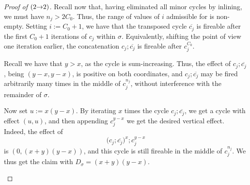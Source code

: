 \begin{proof}[Proof of  $({2}{\rightarrow}{2})$]
Recall now that, having eliminated all minor cycles by inlining,
we must have $n_j > 2C_0$. Thus,
the range of values of $i$ admissible for 
is non-empty. Setting $i := C_0 + 1$, we have that the transposed cycle
$\overline{c_j}$ is fireable after the first $C_0 + 1$ iterations
of $c_j$ within $\sigma$. Equivalently, shifting the point of view
one iteration earlier, the concatenation $c_j; \overline{c_j}$
is fireable after $c_j^{C_0}$.

Recall we have that $y > x$, as the cycle is
sum-increasing. Thus, the effect of $c_j; \overline{c_j}$, being $(y-x, y-x)$,
is positive on both coordinates, and $c_j; \overline{c_j}$ may be fired arbitrarily
many times in the middle of $c_j^{n_j}$, without interference with the remainder of $\sigma$.

Now set $u:=x(y-x)$.
By iterating $x$ times the cycle $c_j; \overline{c_j}$,
we get a cycle with effect $(u,u)$, and then appending
$c_j^{y-x}$ we get the desired vertical effect.
Indeed, the effect of
\[
\big(c_j; \overline{c_j}\big)^{x}; c_j^{y-x}
\]
is $(0, (x+y)(y-x))$, and this cycle is still fireable in the middle of
$c_j^{n_j}$.
We thus get the claim with $D_\sigma = (x+y)(y-x)$.

\begin{figure}[h]
\centering
{}
\end{figure}
\end{proof}
